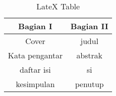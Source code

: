 \begin{table}[h]
\caption{LateX Table}
\centering
\begin{tabular}{|c|c|}
\hline
\textbf{Bagian I}&\textbf{Bagian II}\\
\hline
Cover&judul\\
\hline
Kata pengantar&abstrak\\
\hline
daftar isi&si\\
\hline
kesimpulan&penutup\\
\hline
\end{tabular}
\label{table:permisalan}
\end{table}